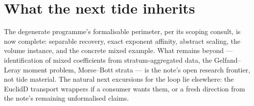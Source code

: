 \documentclass[11pt]{article}
\begin{document}
\section{What the next tide inherits}

The degenerate programme's formalisable perimeter, per its scoping
consult, is now complete: separable recovery, exact exponent
affinity, abstract scaling, the volume instance, and the concrete
mixed example. What remains beyond --- identification of mixed
coefficients from stratum-aggregated data, the Gelfand--Leray moment
problem, Morse--Bott strata --- is the note's open research
frontier, not tide material. The natural next excursions for the
loop lie elsewhere: the EuclidD transport wrappers if a consumer
wants them, or a fresh direction from the note's remaining
unformalised claims.
\end{document}
